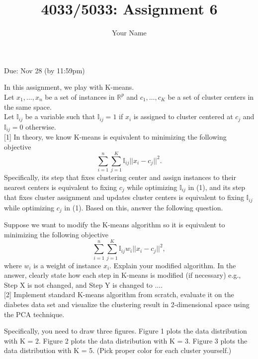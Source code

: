 \documentclass{llncs}
\title{4033/5033: Assignment 6}
\author{Your Name}
\institute{}
\begin{document}
\maketitle 

\setlength\parindent{0pt} 
\setlength{\parskip}{10pt}

Due: Nov 28 (by 11:59pm)

In this assignment, we play with K-means.\\  
Let $x_{1}, \ldots, x_n$ be a set of instances 
in $\mathbb{R}^p$ and $c_1, \ldots, c_K$ be a 
set of cluster centers in the same space.\\  
Let $\mathbb{I}_{ij}$ be a variable such that 
$\mathbb{I}_{ij} = 1$ if 
$x_i$ is assigned to cluster centered at $c_j$ 
and $\mathbb{I}_{ij} = 0$ otherwise.\\  

[1] In theory, we know K-means is equivalent 
to minimizing the following objective
\begin{equation}
\sum_{i=1}^n \sum_{j=1}^K \mathbb{I}_{ij} 
||x_i - c_j||^2.
\end{equation}
Specifically, its step that fixes clustering center 
and assign instances to their nearest centers is 
equivalent to fixing $c_j$ while optimizing $\mathbb{I}_{ij}$ 
in (1), and its step that fixes cluster assignment 
and updates cluster centers is equivalent to 
fixing $\mathbb{I}_{ij}$ while optimizing $c_j$ 
in (1). Based on this, answer the following question. 

Suppose we want to modify the K-means algorithm so it 
is equivalent to minimizing the following objective \begin{equation}
\sum_{i=1}^n \sum_{j=1}^K \mathbb{I}_{ij} 
w_{i} ||x_i - c_j||^2, 
\end{equation}
where $w_i$ is a weight of instance $x_i$. 
Explain your modified algorithm. In the answer, 
clearly state how each step in K-means is modified 
(if necessary) e.g., Step X is not changed, and 
Step Y is changed to ....\\  

[2] Implement standard K-means algorithm from scratch, 
evaluate it on the diabetes data set and visualize 
the clustering result in 2-dimensional space 
using the PCA technique. 

Specifically, you need to draw three figures. 
Figure 1 plots the data distribution with K = 2. 
Figure 2 plots the data distribution with K = 3. 
Figure 3 plots the data distribution with K = 5. 
(Pick proper color for each cluster yourself.) 
\end{document}
